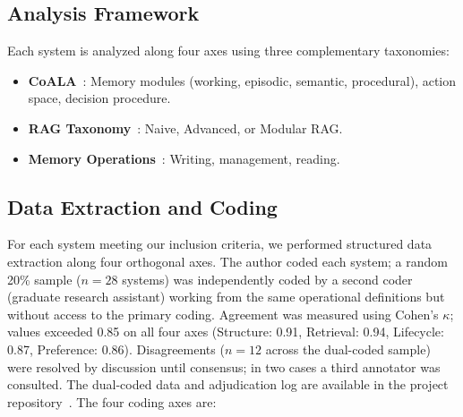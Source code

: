 \subsection{Analysis Framework}

Each system is analyzed along four axes using three complementary
taxonomies:

\begin{itemize}[leftmargin=*, nosep]
    \item \textbf{CoALA}~\cite{sumers2024coala}: Memory modules
    (working, episodic, semantic, procedural), action space, decision
    procedure.
    \item \textbf{RAG Taxonomy}~\cite{gao2023rag}: Naive, Advanced,
    or Modular RAG.
    \item \textbf{Memory Operations}~\cite{zhang2024survey}: Writing,
    management, reading.
\end{itemize}


\subsection{Data Extraction and Coding}
\label{sec:coding}

For each system meeting our inclusion criteria, we performed structured
data extraction along four orthogonal axes.  The author coded each
system; a random 20\% sample ($n = 28$ systems) was independently
coded by a second coder (graduate research assistant) working from the
same operational definitions but without access to the primary coding.
Agreement was measured using Cohen's $\kappa$; values exceeded 0.85 on
all four axes (Structure: 0.91, Retrieval: 0.94, Lifecycle: 0.87,
Preference: 0.86).  Disagreements ($n = 12$ across the dual-coded
sample) were resolved by discussion until consensus; in two cases a
third annotator was consulted.  The dual-coded data and adjudication
log are available in the project repository~\cite{alaya2026}.  The four coding axes are:

